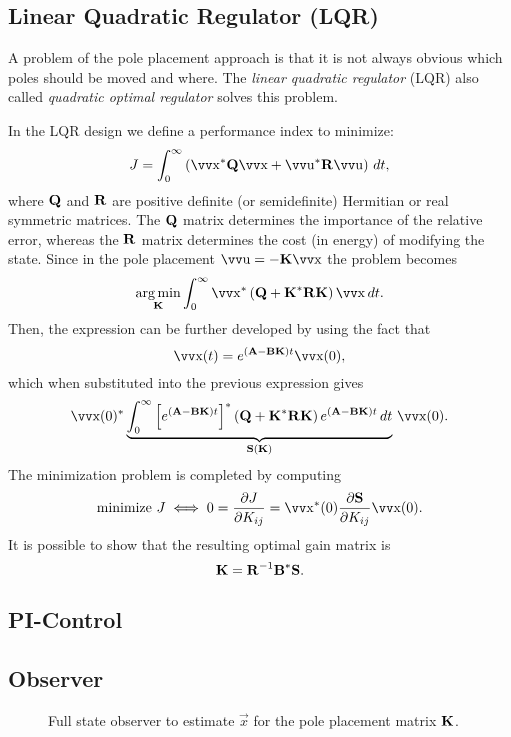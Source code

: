 \subsection{Linear Quadratic Regulator (LQR)}

A problem of the pole placement approach is that it is not always obvious which poles should be moved and where. The \emph{linear quadratic regulator} (LQR) also called \emph{quadratic optimal regulator} solves this problem.

In the LQR design we define a performance index to minimize:
\[
	J = \int_0^\infty \left(
		\vec{x}^* \mx{Q} \vec{x} + \vec{u}^* \mx{R} \vec{u}
	\right) \, dt,
\]
where \(\bm{\mathrm{Q}}\) and \(\bm{\mathrm{R}}\) are positive definite (or semidefinite) Hermitian or real symmetric matrices. The \(\bm{\mathrm{Q}}\) matrix determines the importance of the relative error, whereas the \(\bm{\mathrm{R}}\) matrix determines the cost (in energy) of modifying the state.  Since in the pole placement \(\vec{u} = -\mx{K}\vec{x}\) the problem becomes
\[
	\argmin_{\mx{K}}
	\int_0^\infty \vec{x}^* \left(
		\mx{Q} + \mx{K}^* \mx{R} \mx{K}
	\right) \vec{x} \, dt.
\]
Then, the expression can be further developed by using the fact that
\[
	\vec{x}(t) = e^{(\mx{A} - \mx{B}\mx{K}) t} \vec{x}(0),
\]
which when substituted into the previous expression gives
\[
	\vec{x}(0)^* \underbrace{\int_0^\infty \left[
			e^{(\mx{A} - \mx{B}\mx{K}) t}
		\right]^* \left(
			\mx{Q} + \mx{K}^* \mx{R} \mx{K}
		\right) e^{(\mx{A} - \mx{B}\mx{K}) t}
		\, dt}_{\mx{S}(\mx{K})}
	\, \vec{x}(0).
\]
The minimization problem is completed by computing
\[
	\text{minimize } J \iff
	0 = \frac{\partial J}{\partial K_{ij}} =
	\vec{x}^*(0) \frac{\partial \mx{S}}{\partial K_{ij}} \vec{x}(0).
\]
It is possible to show that the resulting optimal gain matrix is
\[
	\bm{\mathrm{K}} = \bm{\mathrm{R}}^{-1} \bm{\mathrm{B}}^* \bm{\mathrm{S}}.
\]

\subsection{PI-Control}


\subsection{Observer}

\begin{figure}
	\centering
	\resizebox{.9\linewidth}{!}{%
	}
	\caption{
		Full state observer to estimate \(\vec{x}\) for the pole placement matrix \(\bm{\mathrm{K}}\).
		\label{fig:ss-observer}
	}
\end{figure}

